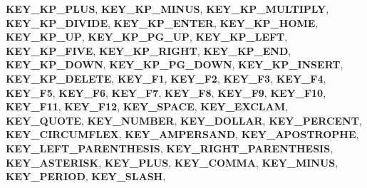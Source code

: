 \begin{DoxyCompactItemize}
{\bfseries K\+E\+Y\+\_\+\+K\+P\+\_\+\+P\+L\+US}, 
\newline
{\bfseries K\+E\+Y\+\_\+\+K\+P\+\_\+\+M\+I\+N\+US}, 
{\bfseries K\+E\+Y\+\_\+\+K\+P\+\_\+\+M\+U\+L\+T\+I\+P\+LY}, 
{\bfseries K\+E\+Y\+\_\+\+K\+P\+\_\+\+D\+I\+V\+I\+DE}, 
{\bfseries K\+E\+Y\+\_\+\+K\+P\+\_\+\+E\+N\+T\+ER}, 
\newline
{\bfseries K\+E\+Y\+\_\+\+K\+P\+\_\+\+H\+O\+ME}, 
{\bfseries K\+E\+Y\+\_\+\+K\+P\+\_\+\+UP}, 
{\bfseries K\+E\+Y\+\_\+\+K\+P\+\_\+\+P\+G\+\_\+\+UP}, 
{\bfseries K\+E\+Y\+\_\+\+K\+P\+\_\+\+L\+E\+FT}, 
\newline
{\bfseries K\+E\+Y\+\_\+\+K\+P\+\_\+\+F\+I\+VE}, 
{\bfseries K\+E\+Y\+\_\+\+K\+P\+\_\+\+R\+I\+G\+HT}, 
{\bfseries K\+E\+Y\+\_\+\+K\+P\+\_\+\+E\+ND}, 
{\bfseries K\+E\+Y\+\_\+\+K\+P\+\_\+\+D\+O\+WN}, 
\newline
{\bfseries K\+E\+Y\+\_\+\+K\+P\+\_\+\+P\+G\+\_\+\+D\+O\+WN}, 
{\bfseries K\+E\+Y\+\_\+\+K\+P\+\_\+\+I\+N\+S\+E\+RT}, 
{\bfseries K\+E\+Y\+\_\+\+K\+P\+\_\+\+D\+E\+L\+E\+TE}, 
{\bfseries K\+E\+Y\+\_\+\+F1}, 
\newline
{\bfseries K\+E\+Y\+\_\+\+F2}, 
{\bfseries K\+E\+Y\+\_\+\+F3}, 
{\bfseries K\+E\+Y\+\_\+\+F4}, 
{\bfseries K\+E\+Y\+\_\+\+F5}, 
\newline
{\bfseries K\+E\+Y\+\_\+\+F6}, 
{\bfseries K\+E\+Y\+\_\+\+F7}, 
{\bfseries K\+E\+Y\+\_\+\+F8}, 
{\bfseries K\+E\+Y\+\_\+\+F9}, 
\newline
{\bfseries K\+E\+Y\+\_\+\+F10}, 
{\bfseries K\+E\+Y\+\_\+\+F11}, 
{\bfseries K\+E\+Y\+\_\+\+F12}, 
{\bfseries K\+E\+Y\+\_\+\+S\+P\+A\+CE}, 
\newline
{\bfseries K\+E\+Y\+\_\+\+E\+X\+C\+L\+AM}, 
{\bfseries K\+E\+Y\+\_\+\+Q\+U\+O\+TE}, 
{\bfseries K\+E\+Y\+\_\+\+N\+U\+M\+B\+ER}, 
{\bfseries K\+E\+Y\+\_\+\+D\+O\+L\+L\+AR}, 
\newline
{\bfseries K\+E\+Y\+\_\+\+P\+E\+R\+C\+E\+NT}, 
{\bfseries K\+E\+Y\+\_\+\+C\+I\+R\+C\+U\+M\+F\+L\+EX}, 
{\bfseries K\+E\+Y\+\_\+\+A\+M\+P\+E\+R\+S\+A\+ND}, 
{\bfseries K\+E\+Y\+\_\+\+A\+P\+O\+S\+T\+R\+O\+P\+HE}, 
\newline
{\bfseries K\+E\+Y\+\_\+\+L\+E\+F\+T\+\_\+\+P\+A\+R\+E\+N\+T\+H\+E\+S\+IS}, 
{\bfseries K\+E\+Y\+\_\+\+R\+I\+G\+H\+T\+\_\+\+P\+A\+R\+E\+N\+T\+H\+E\+S\+IS}, 
{\bfseries K\+E\+Y\+\_\+\+A\+S\+T\+E\+R\+I\+SK}, 
{\bfseries K\+E\+Y\+\_\+\+P\+L\+US}, 
\newline
{\bfseries K\+E\+Y\+\_\+\+C\+O\+M\+MA}, 
{\bfseries K\+E\+Y\+\_\+\+M\+I\+N\+US}, 
{\bfseries K\+E\+Y\+\_\+\+P\+E\+R\+I\+OD}, 
{\bfseries K\+E\+Y\+\_\+\+S\+L\+A\+SH}, 

\end{DoxyCompactItemize}
